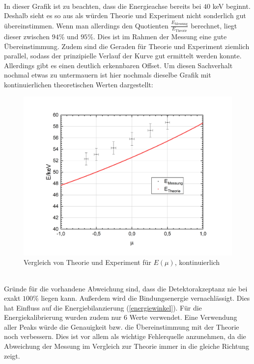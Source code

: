 \documentclass[german,  %
parskip=full,  %
]{scrartcl}
\begin{document}
\\
In dieser Grafik ist zu beachten, dass die Energieachse bereits bei $40$ keV beginnt. Deshalb sieht es so aus als würden Theorie und Experiment nicht sonderlich gut übereinstimmen. Wenn man allerdings den Quotienten $\frac{E_{\text{Messung}}}{E_{\text{Theorie}}}$ berechnet, liegt dieser zwischen $94$\% und $95$\%. Dies ist im Rahmen der Messung eine gute Übereinstimmung. Zudem sind die Geraden für Theorie und Experiment ziemlich parallel, sodass der prinzipielle Verlauf der Kurve gut ermittelt werden konnte. Allerdings gibt es einen deutlich erkennbaren Offset. Um diesen Sachverhalt nochmal etwas zu untermauern ist hier nochmals dieselbe Grafik mit kontinuierlichen theoretischen Werten dargestellt:
\\
\begin{figure}[h!]\centering
\includegraphics[scale=0.5]{vglexptheorie2}
\caption{Vergleich von Theorie und Experiment für $E (\mu)$, kontinuierlich}
\end{figure}
\\
Gründe für die vorhandene Abweichung sind, dass die Detektorakzeptanz nie bei exakt $100$\% liegen kann. Außerdem wird die Bindungsenergie vernachlässigt. Dies hat Einfluss auf die Energiebilanzierung (\ref{energiewinkel}). Für die Energiekalibrierung wurden zudem nur 6 Werte verwendet. Eine Verwendung aller Peaks würde die Genauigkeit bzw. die Übereinstimmung mit der Theorie noch verbessern. Dies ist vor allem als wichtige Fehlerquelle anzunehmen, da die Abweichung der Messung im Vergleich zur Theorie immer in die gleiche Richtung zeigt.
\end{document}
